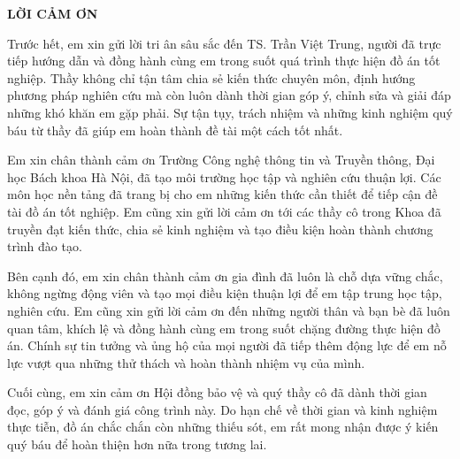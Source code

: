 \documentclass[../DoAn.tex]{subfiles}
\begin{document}
\begin{center}
    \Large{\textbf{LỜI CẢM ƠN}}\\
\end{center}
\vspace{1cm}

Trước hết, em xin gửi lời tri ân sâu sắc đến TS. Trần Việt Trung, người đã trực tiếp hướng dẫn và đồng hành cùng em trong suốt quá trình thực hiện đồ án tốt nghiệp. Thầy không chỉ tận tâm chia sẻ kiến thức chuyên môn, định hướng phương pháp nghiên cứu mà còn luôn dành thời gian góp ý, chỉnh sửa và giải đáp những khó khăn em gặp phải. Sự tận tụy, trách nhiệm và những kinh nghiệm quý báu từ thầy đã giúp em hoàn thành đề tài một cách tốt nhất.

Em xin chân thành cảm ơn Trường Công nghệ thông tin và Truyền thông, Đại học Bách khoa Hà Nội, đã tạo môi trường học tập và nghiên cứu thuận lợi. Các môn học nền tảng đã trang bị cho em những kiến thức cần thiết để tiếp cận đề tài đồ án tốt nghiệp. Em cũng xin gửi lời cảm ơn tới các thầy cô trong Khoa đã truyền đạt kiến thức, chia sẻ kinh nghiệm và tạo điều kiện hoàn thành chương trình đào tạo.

Bên cạnh đó, em xin chân thành cảm ơn gia đình đã luôn là chỗ dựa vững chắc, không ngừng động viên và tạo mọi điều kiện thuận lợi để em tập trung học tập, nghiên cứu. Em cũng xin gửi lời cảm ơn đến những người thân và bạn bè đã luôn quan tâm, khích lệ và đồng hành cùng em trong suốt chặng đường thực hiện đồ án. Chính sự tin tưởng và ủng hộ của mọi người đã tiếp thêm động lực để em nỗ lực vượt qua những thử thách và hoàn thành nhiệm vụ của mình.

Cuối cùng, em xin cảm ơn Hội đồng bảo vệ và quý thầy cô đã dành thời gian đọc, góp ý và đánh giá công trình này. Do hạn chế về thời gian và kinh nghiệm thực tiễn, đồ án chắc chắn còn những thiếu sót, em rất mong nhận được ý kiến quý báu để hoàn thiện hơn nữa trong tương lai.

\end{document}

